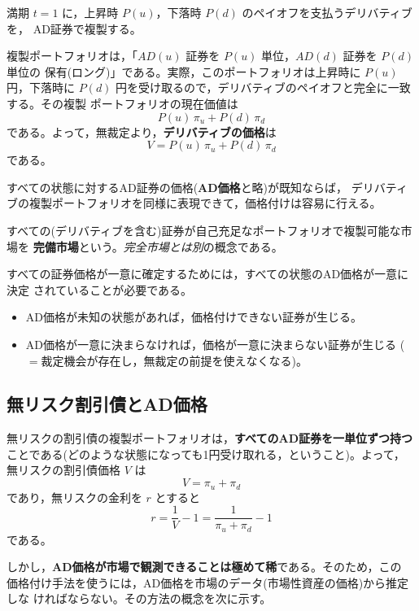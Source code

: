 満期 $t=1$ に，上昇時 $P(u)$，下落時 $P(d)$ のペイオフを支払うデリバティブを，
AD証券で複製する。

複製ポートフォリオは，「$AD(u)$ 証券を $P(u)$ 単位，$AD(d)$ 証券を $P(d)$ 単位の
保有(ロング)」である。実際，このポートフォリオは上昇時に $P(u)$ 円，下落時に
$P(d)$ 円を受け取るので，デリバティブのペイオフと完全に一致する。その複製
ポートフォリオの現在価値は
\[
P(u)\,\pi_u + P(d)\,\pi_d
\]
である。よって，無裁定より，\textbf{デリバティブの価格}は
\begin{equation}
V = P(u)\,\pi_u + P(d)\,\pi_d
\label{eq:ad-price}
\end{equation}
である。

すべての状態に対するAD証券の価格(\textbf{AD価格}と略)が既知ならば，
デリバティブの複製ポートフォリオを同様に表現できて，価格付けは容易に行える。

\begin{definition}[完備市場]
すべての(デリバティブを含む)証券が自己充足なポートフォリオで複製可能な市場を
\textbf{完備市場}という。\emph{完全市場とは別}の概念である。
\end{definition}

すべての証券価格が一意に確定するためには，すべての状態のAD価格が一意に決定
されていることが必要である。
\begin{itemize}
\item AD価格が未知の状態があれば，価格付けできない証券が生じる。
\item AD価格が一意に決まらなければ，価格が一意に決まらない証券が生じる
($=$裁定機会が存在し，無裁定の前提を使えなくなる)。
\end{itemize}

\subsection{無リスク割引債とAD価格}

無リスクの割引債の複製ポートフォリオは，\textbf{すべてのAD証券を一単位ずつ持つ}
ことである(どのような状態になっても1円受け取れる，ということ)。よって，
無リスクの割引債価格 $V$ は
\begin{equation}
V = \pi_u + \pi_d
\end{equation}
であり，無リスクの金利を $r$ とすると
\begin{equation}
r = \frac{1}{V} - 1 = \frac{1}{\pi_u + \pi_d} - 1
\end{equation}
である。

しかし，\textbf{AD価格が市場で観測できることは極めて稀}である。そのため，この
価格付け手法を使うには，AD価格を市場のデータ(市場性資産の価格)から推定しな
ければならない。その方法の概念を次に示す。

